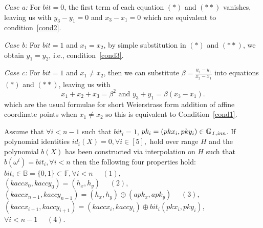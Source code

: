 \noindent \textit{Case a:} For $\mathit{bit}=0$, the first term of each equation $(\ast)$ and $(\ast \ast)$ vanishes, 
leaving us with $y_3-y_1=0$ and $x_3-x_1=0$ which are equivalent to condition~\ref{cond2}. \\
\vspace{-0.1in}

\noindent \textit{Case b:} For $\mathit{bit}=1$ and $x_1=x_2$, by simple substitution in $(\ast)$ and $(\ast \ast)$, 
we obtain $y_1 = y_2$, i.e., condition~\ref{cond3}.  \\
\vspace{-0.1in}

\noindent \textit{Case c:} For $\mathit{bit}=1$ and $x_1 \neq x_2$, then we can substitute
$\beta=\frac{y_2-y_1}{x_2-x_1}$ into equations $(\ast)$ and $(\ast \ast)$, leaving us with
$$x_1+x_2+x_3=\beta^2 \textrm{ and } y_3+y_1=\beta(x_3-x_1).$$
which are the usual formulae for short Weierstrass form addition of affine coordinate points when $x_1 \neq x_2$ 
so this is equivalent to Condition~\ref{cond1}. \\
\vspace{-0.1in}


\begin{test_claim} Assume that $\forall i < n-1$ such that $\mathit{bit}_i = 1$, $pk_i = (pkx_i, pky_i) \in \mathbb{G}_{\mathit{1,inn}}$. 
If polynomial identities $id_i(X) = 0, \forall i \in [5],$ hold over range 
$H$ and the polynomial $b(X)$ has been constructed via interpolation on $H$ such that 
$b(\omega^i) = \mathit{bit}_i, \forall i <n$ then the following four properties hold: \\
$\mathit{bit}_i \in \mathbb{B} = \{0,1\} \subset \mathbb{F}, \forall i <n \ \ \ \ \ \ (1)$, \\
$(kaccx_{0}, kaccy_{0}) = (h_x, h_y) \ \ \ \ \ \ (2) $, \\
$(kaccx_{n-1}, kaccy_{n-1}) = (h_x, h_y) \oplus (apk_x, apk_y) \ \ \ \ \ \ (3) $,  \\
$(kaccx_{i+1}, kaccy_{i+1}) =  (kaccx_{i}, kaccy_{i}) \oplus \mathit{bit}_i(pkx_{i}, pky_{i})$, $\forall i < n-1 \ \ \ \ \ \ (4) $.
\label{claim:keys_affine_comm}
\end{test_claim}
\vspace{-0.08in}

